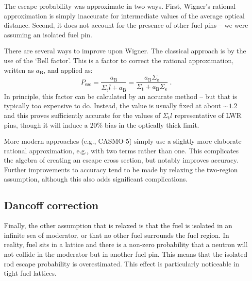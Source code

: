The escape probability was approximate in two ways. First, Wigner's rational approximation is simply inaccurate for intermediate values of the average optical distance. Second, it does not account for the presence of other fuel pins -- we were assuming an isolated fuel pin.

There are several ways to improve upon Wigner. The classical approach is by the use of the `Bell factor'. This is a factor to correct the rational approximation, written as $a_\mathrm{B}$, and applied as:
\begin{equation*}
    P_\mathrm{esc} = \frac{a_\mathrm{B}}{\Sigma_\mathrm{t}\bar{l} + a_\mathrm{B}}=\frac{a_\mathrm{B}\Sigma_\mathrm{e}}{\Sigma_\mathrm{t} + a_\mathrm{B}\Sigma_\mathrm{e}}\;\mathrm{.}
\end{equation*}
In principle, this factor can be calculated by an accurate method -- but that is typically too expensive to do. Instead, the value is usually fixed at about $\sim 1.2$ and this proves sufficiently accurate for the values of $\Sigma_\mathrm{t}l$ representative of LWR pins, though it will induce a $20\%$ bias in the optically thick limit.

More modern approaches (e.g., CASMO-5) simply use a slightly more elaborate rational approximation, e.g., with two terms rather than one. This complicates the algebra of creating an escape cross section, but notably improves accuracy. Further improvements to accuracy tend to be made by relaxing the two-region assumption, although this also adds significant complications.

\subsection{Dancoff correction}

Finally, the other assumption that is relaxed is that the fuel is isolated in an infinite sea of moderator, or that no other fuel surrounds the fuel region. In reality, fuel sits in a lattice and there is a non-zero probability that a neutron will not collide in the moderator but in another fuel pin. This means that the isolated rod escape probability is overestimated. This effect is particularly noticeable in tight fuel lattices.

